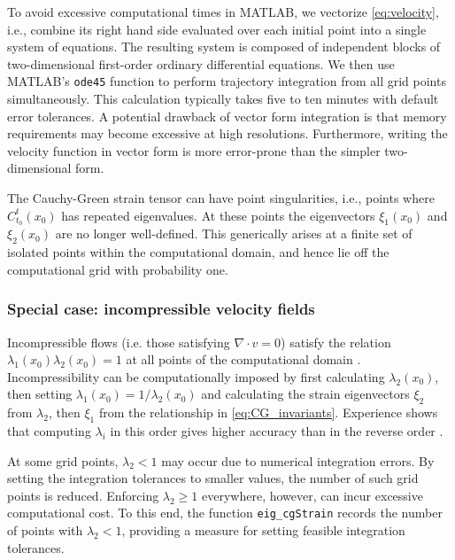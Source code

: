 \documentclass[5p]{elsarticle}
\begin{document}
To avoid excessive computational times in MATLAB, we vectorize \cref{eq:velocity}, i.e., combine its right hand side evaluated over each initial point into a single system of equations. The resulting system is composed of independent blocks of two-dimensional first-order ordinary differential equations. We then use MATLAB's \lstinline!ode45! function to perform trajectory integration from all grid points simultaneously. This calculation typically takes five to ten minutes with default error tolerances.
A potential drawback of vector form integration is that memory requirements may become excessive at high resolutions. Furthermore, writing the velocity function in vector form is more error-prone than the simpler two-dimensional form.

The Cauchy-Green strain tensor can have point singularities, i.e., points where $C_{t_0}^t(x_0)$ has repeated eigenvalues.
At these points the eigenvectors $\xi_1(x_0)$ and $\xi_2(x_0)$ are no longer well-defined.
This generically arises at a finite set of isolated points within the computational domain\citep{delmarcelle94}, and hence lie off the computational grid with probability one.

\subsubsection{Special case: incompressible velocity fields}

Incompressible flows (i.e. those satisfying $\nabla \cdot v=0$) satisfy the relation $\lambda_1(x_0) \lambda_2(x_0) = 1$ at all points of the computational domain \citep{arnold89:_mathem}. Incompressibility can be computationally imposed by first calculating $\lambda_2(x_0)$, then setting $\lambda_1(x_0) = 1/\lambda_2(x_0)$ and calculating the strain eigenvectors $\xi_2$ from $\lambda_2$, then $\xi_1$ from the relationship in \cref{eq:CG_invariants}. Experience shows that computing $\lambda_i$ in this order gives higher accuracy than in the reverse order \citep{farazmand12:_comput_lagran}.

At some grid points, $\lambda_2 < 1$ may occur due to numerical integration errors. By setting the integration tolerances to smaller values, the number of such grid points is reduced. Enforcing $\lambda_2 \geq 1$ everywhere, however, can incur excessive computational cost. To this end, the function \lstinline!eig_cgStrain! records the number of points with $\lambda_2 < 1$, providing a measure for setting feasible integration tolerances.
\end{document}
